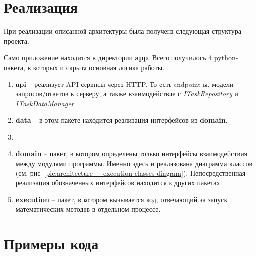 \section*{\Large{Реализация}}

При реализации описанной архитектуры была получена следующая структура проекта.

Само приложение находится в директории \textbf{app}.
Всего получилось 4 python-пакета, в которых и скрыта основная логика работы.
\begin{enumerate}
    \item \textbf{api} -- реализует API сервисы через HTTP. То есть endpoint-ы,
    модели запросов/ответов к серверу, а также взаимодействие с \textit{ITaskRepository} и \textit{ITaskDataManager}
    \item \textbf{data} -- в этом пакете находится реализация интерфейсов из \textbf{domain}.
    \item \item \textbf{domain} -- пакет, в котором определены только интерфейсы взаимодействия между модулями программы.
    Именно здесь и реализована диаграмма классов (см. рис\ \ref{pic:architecture__execution-classes-diagram}). Непосредственная
    реализация обозначенных интерфейсов находится в других пакетах.
    \item \textbf{execution} -- пакет, в котором вызывается код, отвечающий за запуск математических методов
    в отдельном процессе.
\end{enumerate}

\section*{\Large{Примеры кода}}

